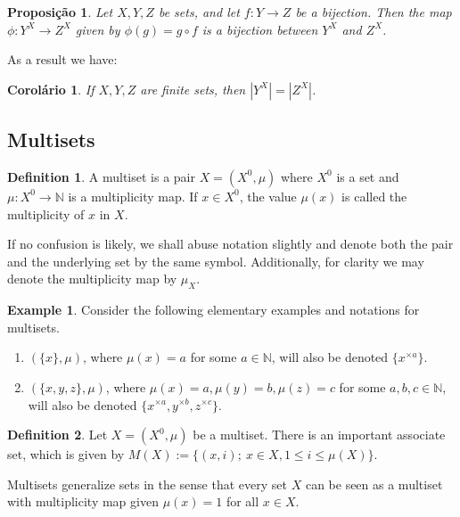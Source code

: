 \documentclass[]{article}
\newtheorem{proposition}{Proposição}[section]
\newtheorem{coro}{Corolário}[section]
\theoremstyle{definition}
\newtheorem{definition}{Definition}[section]
\theoremstyle{definition}
\newtheorem{exmp}{Example}[section]
\newcommand{\raw}{\rightarrow}
\newcommand{\bb}{\mathbb}
\begin{document}
\begin{proposition}
	Let $X, Y, Z$ be sets, and let $f:Y\raw Z$ be a bijection. Then the map $\phi:Y^X \raw Z^X$ given by $\phi(g)=g\circ f$ is a bijection between $Y^X$ and $Z^X$.
\end{proposition}

As a result we have:

\begin{coro}
	If $X, Y, Z$ are finite sets, then $|Y^X|=|Z^X|$.
\end{coro}

\subsection{Multisets}

\begin{definition}
	A multiset is a pair $X = (X^0, \mu)$ where $X^0$ is a set and $\mu: X^0 \raw \bb{N}$ is a multiplicity map. If $x \in X^0$, the value $\mu(x)$ is called the multiplicity of $x$ in $X$.
\end{definition}

If no confusion is likely, we shall abuse notation slightly and denote both the pair and the underlying set by the same symbol. Additionally, for clarity we may denote the multiplicity map by $\mu_X$.

\begin{exmp}
	Consider the following elementary examples and notations for multisets.
	
	\begin{enumerate}
		\item $(\{x\}, \mu)$, where $\mu(x)=a$ for some $a \in \bb{N}$, will also be denoted $\{x^{\times a} \}$.
		
		\item $(\{x, y, z\}, \mu)$, where $\mu(x)=a, \mu(y)=b, \mu(z)=c$ for some $a, b, c \in \bb{N}$, will also be denoted $\{x^{\times a},y^{\times b}, z^{\times c} \}$.
	\end{enumerate}
	
	
\end{exmp}

\begin{definition}
	Let $X = (X^0, \mu)$ be a multiset. There is an important associate set, which is given by $M(X) := \{(x, i); \ x \in X, 1\leq i \leq \mu(X) \}$. 	
\end{definition}

Multisets generalize sets in the sense that every set $X$ can be seen as a multiset with multiplicity map given $\mu(x)=1$ for all $x \in X$.
\end{document}
